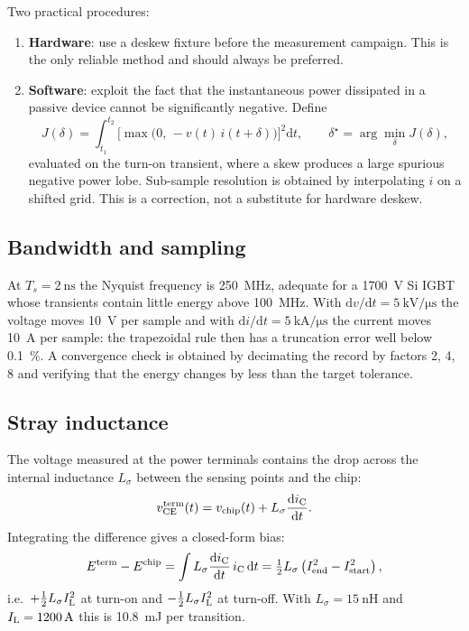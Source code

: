 Two practical procedures:
\begin{enumerate}
\item \textbf{Hardware}: use a deskew fixture before the measurement campaign. This is the
only reliable method and should always be preferred.
\item \textbf{Software}: exploit the fact that the instantaneous power dissipated in a
passive device cannot be significantly negative. Define
\begin{equation}
J(\delta)=\int_{t_1}^{t_2}\big[\max\!\big(0,\,-v(t)\,i(t+\delta)\big)\big]^2\mathrm{d}t,
\qquad \delta^\star=\arg\min_\delta J(\delta),
\label{dpt:eq:softdeskew}
\end{equation}
evaluated on the turn-on transient, where a skew produces a large spurious negative
power lobe. Sub-sample resolution is obtained by interpolating $i$ on a shifted grid.
This is a correction, not a substitute for hardware deskew.
\end{enumerate}

\subsection{Bandwidth and sampling}

At $T_s=\SI{2}{\nano\second}$ the Nyquist frequency is \SI{250}{\mega\hertz}, adequate for
a \SI{1700}{\volt} Si IGBT whose transients contain little energy above
\SI{100}{\mega\hertz}. With $\mathrm{d}v/\mathrm{d}t=\SI{5}{\kilo\volt\per\micro\second}$
the voltage moves \SI{10}{\volt} per sample and with
$\mathrm{d}i/\mathrm{d}t=\SI{5}{\kilo\ampere\per\micro\second}$ the current moves
\SI{10}{\ampere} per sample: the trapezoidal rule then has a truncation error well below
\SI{0.1}{\percent}. A convergence check is obtained by decimating the record by factors
2, 4, 8 and verifying that the energy changes by less than the target tolerance.

\subsection{Stray inductance}

The voltage measured at the power terminals contains the drop across the internal
inductance $L_\sigma$ between the sensing points and the chip:
\begin{equation}
v_{\mathrm{CE}}^{\mathrm{term}}(t)=v_{\mathrm{chip}}(t)+L_\sigma\frac{\mathrm{d}i_{\mathrm{C}}}{\mathrm{d}t}.
\end{equation}
Integrating the difference gives a closed-form bias:
\begin{equation}
E^{\mathrm{term}}-E^{\mathrm{chip}}
=\int L_\sigma \frac{\mathrm{d}i_{\mathrm{C}}}{\mathrm{d}t}\,i_{\mathrm{C}} \,\mathrm{d}t
=\tfrac{1}{2}L_\sigma\left(I_{\mathrm{end}}^2-I_{\mathrm{start}}^2\right),
\label{dpt:eq:Lsigma}
\end{equation}
i.e.\ $+\tfrac{1}{2}L_\sigma I_{\mathrm{L}}^2$ at turn-on and $-\tfrac{1}{2}L_\sigma I_{\mathrm{L}}^2$ at
turn-off. With $L_\sigma=\SI{15}{\nano\henry}$ and $I_{\mathrm{L}}=\SI{1200}{\ampere}$ this is
\SI{10.8}{\milli\joule} per transition.

